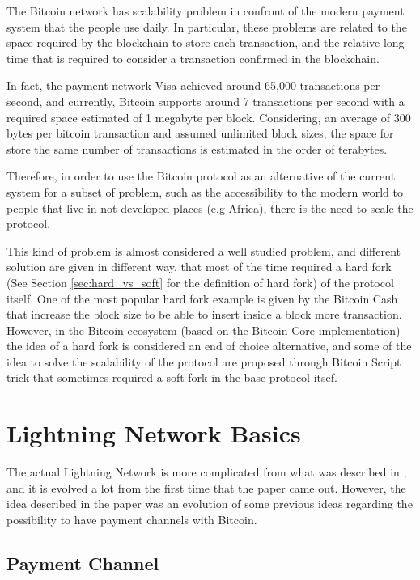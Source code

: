 The Bitcoin network has scalability problem in confront of the modern payment system that the people use daily.
In particular, these problems are related to the space required by the blockchain to store each transaction,
and the relative long time that is required to consider a transaction confirmed in the blockchain.

In fact, the payment network Visa achieved around 65,000\cite{visa-sheet} transactions per second, and currently,
Bitcoin supports around 7 transactions per second with a required space estimated of 1 megabyte per block. Considering,
an average of 300 bytes per bitcoin transaction and assumed unlimited block sizes, the space for store the same number
of transactions is estimated in the order of terabytes\cite{lightning-network-paper}.

Therefore, in order to use the Bitcoin protocol as an alternative of the current system for a subset of
problem, such as the accessibility to the modern world to people that live in not developed places (e.g Africa),
there is the need to scale the protocol.

This kind of problem is almost considered a well studied problem, and different solution are given in different
way, that most of the time required a hard fork (See Section \ref{sec:hard_vs_soft} for the definition of hard fork) of the protocol itself.
One of the most popular hard fork example is given by the Bitcoin Cash that increase the block size to be able to insert
inside a block more transaction.
However, in the Bitcoin ecosystem (based on the Bitcoin Core implementation) the idea of a hard fork is considered an
end of choice alternative, and some of the idea to solve the scalability of the protocol are proposed through Bitcoin Script trick
that sometimes required a soft fork in the base protocol itsef.

\section{Lightning Network Basics}

The actual Lightning Network is more complicated from what was described in \cite{lightning-network-paper}, and it is
evolved a lot from the first time that the paper came out. However, the idea described in the paper was an evolution
of some previous ideas regarding the possibility to have payment channels with Bitcoin.

\subsection{Payment Channel}

